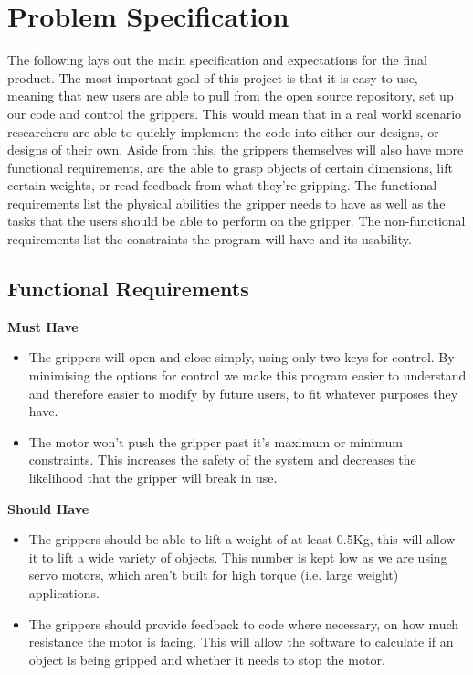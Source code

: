 \documentclass{l4proj}
\begin{document}
\section{Problem Specification}
The following lays out the main specification and expectations for the final product. The most important goal of this project is that it is easy to use, meaning that new users are able to pull from the open source repository, set up our code and control the grippers. This would mean that in a real world scenario researchers are able to quickly implement the code into either our designs, or designs of their own. Aside from this, the grippers themselves will also have more functional requirements, are the able to grasp objects of certain dimensions, lift certain weights, or read feedback from what they're gripping. The functional requirements list the physical abilities the gripper needs to have as well as the tasks that the users should be able to perform on the gripper. The non-functional requirements list the constraints the program will have and its usability. 

\subsection{Functional Requirements}

\textbf{Must Have}
\begin{itemize}
	\item The grippers will open and close simply, using only two keys for control. By minimising the options for control we make this program easier to understand and therefore easier to modify by future users, to fit whatever purposes they have. 
	\item The motor won't push the gripper past it's maximum or minimum constraints. This increases the safety of the system and decreases the likelihood that the gripper will break in use. 
	
\end{itemize}
\textbf{Should Have}
\begin{itemize}
	\item The grippers should be able to lift a weight of at least 0.5Kg, this will allow it to lift a wide variety of objects. This number is kept low as we are using servo motors, which aren't built for high torque (i.e. large weight) applications. 
	\item The grippers should provide feedback to code where necessary, on how much resistance the motor is facing. This will allow the software to calculate if an object is being gripped and whether it needs to stop the motor. 
\end{itemize}
\end{document}
